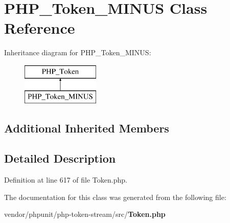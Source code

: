 \section{P\+H\+P\+\_\+\+Token\+\_\+\+M\+I\+N\+U\+S Class Reference}
\label{class_p_h_p___token___m_i_n_u_s}
Inheritance diagram for P\+H\+P\+\_\+\+Token\+\_\+\+M\+I\+N\+U\+S\+:\begin{figure}[H]
\begin{center}
\leavevmode
\includegraphics[height=2.000000cm]{class_p_h_p___token___m_i_n_u_s}
\end{center}
\end{figure}
\subsection*{Additional Inherited Members}


\subsection{Detailed Description}


Definition at line 617 of file Token.\+php.



The documentation for this class was generated from the following file\+:\begin{DoxyCompactItemize}
\item 
vendor/phpunit/php-\/token-\/stream/src/{\bf Token.\+php}\end{DoxyCompactItemize}
